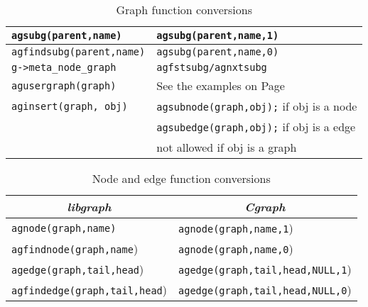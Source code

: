 \documentclass[11pt,letterpaper]{article}
\begin{document}
\begin{savenotes}
\begin{table*}[htb]
\begin{tabular}{|l|l|}
\verb"agsubg(parent,name)"      &   \verb"agsubg(parent,name,1)" \\ \hline
\verb"agfindsubg(parent,name)"      &   \verb"agsubg(parent,name,0)" \\ \hline
\verb"g->meta_node_graph"            &  \verb"agfstsubg/agnxtsubg" \\
\verb"agusergraph(graph)"  &  See the examples on Page~\pageref{subg}\\ \hline
\verb"aginsert(graph, obj)" &  \verb"agsubnode(graph,obj);" if obj is a node \\
                      &  \verb"agsubedge(graph,obj);" if obj is a edge \\
                      & not allowed if obj is a graph \\ \hline
\end{tabular}
\caption{Graph function conversions}
\label{table:libgraph:g}
\end{table*}

\begin{table*}[ht]
\centering
\begin{tabular}{|l|l|} \hline
\multicolumn{1}{|c|}{\em libgraph} & \multicolumn{1}{c|}{\em Cgraph} \\ \hline
\verb"agnode(graph,name)" & \verb"agnode(graph,name,1") \\ \hline
\verb"agfindnode(graph,name") & \verb"agnode(graph,name,0") \\ \hline
\verb"agedge(graph,tail,head") & \verb"agedge(graph,tail,head,NULL,1") \\ \hline
\verb"agfindedge(graph,tail,head") & \verb"agedge(graph,tail,head,NULL,0") \\ \hline
\end{tabular}
\caption{Node and edge function conversions}
\label{table:libgraph:n}
\end{table*}


\end{savenotes}
\end{document}
